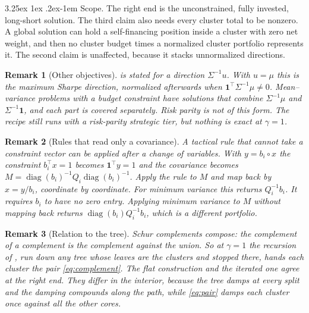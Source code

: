 \documentclass[11pt]{article}
\makeatletter
\renewcommand\paragraph{\@startsection{paragraph}{4}{\z@}%
  {3.25ex \@plus1ex \@minus.2ex}{-1em}%
  {\normalfont\normalsize\itshape}}
\newcommand{\ones}{\mathbf{1}}
\DeclareMathOperator{\diag}{diag}
\newtheorem{remark}{Remark}
\makeatother
\begin{document}
\paragraph{Scope.} The right end is the unconstrained, fully invested,
long-short solution. The third claim also needs every cluster total to be
nonzero. A global solution can hold a self-financing position inside a
cluster with zero net weight, and then no cluster budget times a normalized
cluster portfolio represents it. The second claim is unaffected, because it
stacks unnormalized directions.

\begin{remark}[Other objectives]
 is stated for a direction $\Sigma^{-1}u$. With $u=\mu$
this is the maximum Sharpe direction, normalized afterwards when
$\ones^\top\Sigma^{-1}\mu\neq0$. Mean--variance problems with a budget
constraint have solutions that combine $\Sigma^{-1}\mu$ and
$\Sigma^{-1}\ones$, and each part is covered separately. Risk parity is not
of this form. The recipe still runs with a risk-parity strategic tier, but
nothing is exact at $\gamma=1$.
\end{remark}

\begin{remark}[Rules that read only a covariance]
A tactical rule that cannot take a constraint vector can be applied after
a change of variables. With $y=b_i\circ x$ the constraint $b_i^\top x=1$
becomes $\ones^\top y=1$ and the covariance becomes
$M=\diag(b_i)^{-1}Q_i\diag(b_i)^{-1}$. Apply the rule to $M$ and map back by
$x=y/b_i$, coordinate by coordinate. For minimum variance this returns
$Q_i^{-1}b_i$. It requires $b_i$ to have no zero entry. Applying minimum
variance to $M$ without mapping back returns $\diag(b_i)Q_i^{-1}b_i$, which
is a different portfolio.
\end{remark}

\begin{remark}[Relation to the tree]
Schur complements compose: the complement of a complement is the complement
against the union. So at $\gamma=1$ the recursion of
\textcite{cotton2024schur}, run down any tree whose leaves are the clusters
and stopped there, hands each cluster the pair \eqref{eq:complement}. The
flat construction and the iterated one agree at the right end. They differ
in the interior, because the tree damps at every split and the damping
compounds along the path, while \eqref{eq:pair} damps each cluster once
against all the other cores.
\end{remark}
\end{document}
